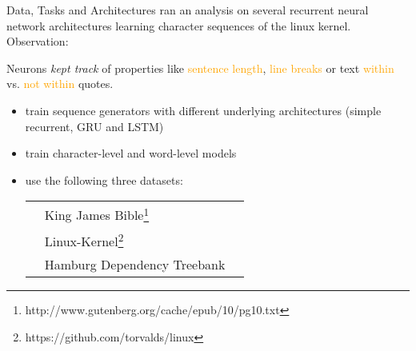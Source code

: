 \begin{frame}{Data, Tasks and Architectures}
	\citet{karpathy2015visualizing} ran an analysis on several recurrent neural network architectures learning character sequences of the linux kernel. Observation:
	
	Neurons \textit{kept track} of properties like \textcolor{orange}{sentence length}, \textcolor{orange}{line breaks} or text \textcolor{orange}{within} vs. \textcolor{orange}{not within} quotes.
	
	\begin{block}{}
		\begin{itemize}
			\item train sequence generators with different underlying architectures (simple recurrent, GRU and LSTM)
			\item train character-level and word-level models
			\item use the following three datasets:			

			\vspace{1em}
			\begin{tabular}{lll}
				\kj & King James Bible\footnote{ http://www.gutenberg.org/cache/epub/10/pg10.txt} &\\
				\lk & Linux-Kernel\footnote{https://github.com/torvalds/linux} & \\
				\hdt & Hamburg Dependency Treebank & \citet{foth2014because}
			\end{tabular}
		\end{itemize}
	\end{block}
\end{frame}